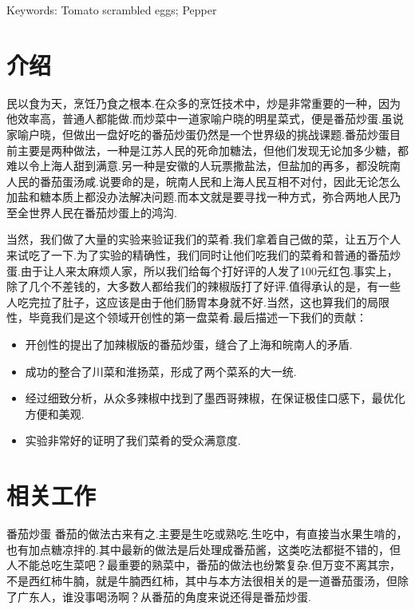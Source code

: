 \vspace{1em}\noindent
{\hei Keywords:}
{\songti \rm Tomato scrambled eggs; Pepper}

\clearpage



\section{介绍}
民以食为天，烹饪乃食之根本.在众多的烹饪技术中，炒是非常重要的一种，因为他效率高，普通人都能做.而炒菜中一道家喻户晓的明星菜式，便是番茄炒蛋.虽说家喻户晓，但做出一盘好吃的番茄炒蛋仍然是一个世界级的挑战课题.番茄炒蛋目前主要是两种做法，一种是江苏人民的死命加糖法，但他们发现无论加多少糖，都难以令上海人甜到满意.另一种是安徽的人玩票撒盐法，但盐加的再多，都没皖南人民的番茄蛋汤咸.说要命的是，皖南人民和上海人民互相不对付，因此无论怎么加盐和糖本质上都没办法解决问题.而本文就是要寻找一种方式，弥合两地人民乃至全世界人民在番茄炒蛋上的鸿沟.

当然，我们做了大量的实验来验证我们的菜肴.我们拿着自己做的菜，让五万个人来试吃了一下.为了实验的精确性，我们同时让他们吃我们的菜肴和普通的番茄炒蛋.由于让人来太麻烦人家，所以我们给每个打好评的人发了100元红包.事实上，除了几个不差钱的，大多数人都给我们的辣椒版打了好评.值得承认的是，有一些人吃完拉了肚子，这应该是由于他们肠胃本身就不好.当然，这也算我们的局限性，毕竟我们是这个领域开创性的第一盘菜肴.最后描述一下我们的贡献：
\begin{itemize}[leftmargin=*,noitemsep]
    \item 开创性的提出了加辣椒版的番茄炒蛋，缝合了上海和皖南人的矛盾.
    \item 成功的整合了川菜和淮扬菜，形成了两个菜系的大一统.
    \item 经过细致分析，从众多辣椒中找到了墨西哥辣椒，在保证极佳口感下，最优化方便和美观.
    \item 实验非常好的证明了我们菜肴的受众满意度.
\end{itemize}




\clearpage
\section{相关工作}
番茄炒蛋 番茄的做法古来有之.主要是生吃或熟吃.生吃中，有直接当水果生啃的\cite{example2022}，也有加点糖凉拌的\cite{example2022}.其中最新的做法是后处理成番茄酱\cite{example2022}，这类吃法都挺不错的，但人不能总吃生菜吧？最重要的熟菜中，番茄的做法也纷繁复杂.但万变不离其宗，不是西红柿牛腩，就是牛腩西红柿，其中与本方法很相关的是一道番茄蛋汤，但除了广东人，谁没事喝汤啊？从番茄的角度来说还得是番茄炒蛋.

